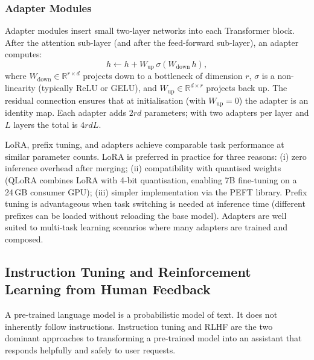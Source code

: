 \begin{deepdive}
\subsubsection*{Adapter Modules}

Adapter modules \cite{houlsby2019adapters} insert small two-layer networks into
each Transformer block.  After the attention sub-layer (and after the feed-forward
sub-layer), an adapter computes:
\begin{equation}
  h \leftarrow h + W_{\mathrm{up}} \, \sigma(W_{\mathrm{down}} \, h),
  \label{eq:adapter}
\end{equation}
where $W_{\mathrm{down}} \in \mathbb{R}^{r \times d}$ projects down to a
bottleneck of dimension $r$, $\sigma$ is a non-linearity (typically ReLU or
GELU), and $W_{\mathrm{up}} \in \mathbb{R}^{d \times r}$ projects back up.
The residual connection ensures that at initialisation (with $W_{\mathrm{up}} = 0$)
the adapter is an identity map.  Each adapter adds $2rd$ parameters; with two
adapters per layer and $L$ layers the total is $4rdL$.

\begin{remark}
\label{rem:peft-comparison}
LoRA, prefix tuning, and adapters achieve comparable task performance at similar
parameter counts.  LoRA is preferred in practice for three reasons: (i) zero
inference overhead after merging; (ii) compatibility with quantised weights
(QLoRA combines LoRA with 4-bit quantisation, enabling 7B fine-tuning on a
24\,GB consumer GPU); (iii) simpler implementation via the PEFT library.
Prefix tuning is advantageous when task switching is needed at inference
time (different prefixes can be loaded without reloading the base model).
Adapters are well suited to multi-task learning scenarios where many adapters
are trained and composed.
\end{remark}

\subsection{Instruction Tuning and Reinforcement Learning from Human Feedback}
\label{subsec:instruction-tuning}

A pre-trained language model is a probabilistic model of text.  It does not
inherently follow instructions.  Instruction tuning and RLHF are the two
dominant approaches to transforming a pre-trained model into an assistant
that responds helpfully and safely to user requests.


\end{deepdive}
